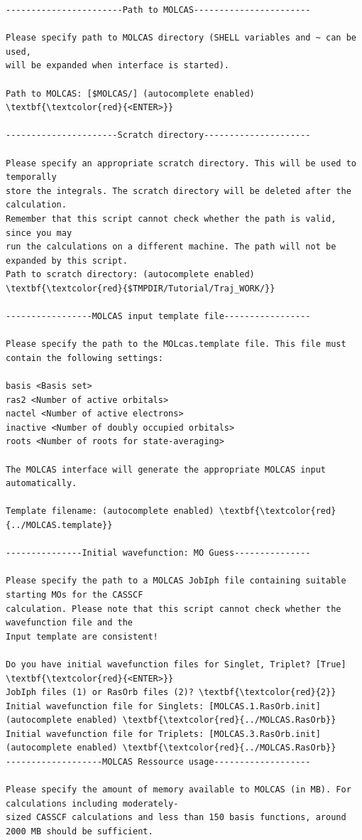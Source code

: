 \documentclass[a4paper,11pt,DIV=15,openany]{scrbook}
\begin{document}
\begin{oframed}
\begin{Verbatim}[commandchars=\\\{\}]
-----------------------Path to MOLCAS-----------------------

Please specify path to MOLCAS directory (SHELL variables and ~ can be used, 
will be expanded when interface is started).

Path to MOLCAS: [$MOLCAS/] (autocomplete enabled) \textbf{\textcolor{red}{<ENTER>}}

----------------------Scratch directory---------------------

Please specify an appropriate scratch directory. This will be used to temporally 
store the integrals. The scratch directory will be deleted after the calculation. 
Remember that this script cannot check whether the path is valid, since you may 
run the calculations on a different machine. The path will not be expanded by this script.
Path to scratch directory: (autocomplete enabled) \textbf{\textcolor{red}{$TMPDIR/Tutorial/Traj_WORK/}}

-----------------MOLCAS input template file-----------------

Please specify the path to the MOLcas.template file. This file must contain the following settings:

basis <Basis set>
ras2 <Number of active orbitals>
nactel <Number of active electrons>
inactive <Number of doubly occupied orbitals>
roots <Number of roots for state-averaging>

The MOLCAS interface will generate the appropriate MOLCAS input automatically.

Template filename: (autocomplete enabled) \textbf{\textcolor{red}{../MOLCAS.template}}

---------------Initial wavefunction: MO Guess---------------

Please specify the path to a MOLCAS JobIph file containing suitable starting MOs for the CASSCF 
calculation. Please note that this script cannot check whether the wavefunction file and the 
Input template are consistent!

Do you have initial wavefunction files for Singlet, Triplet? [True] \textbf{\textcolor{red}{<ENTER>}}
JobIph files (1) or RasOrb files (2)? \textbf{\textcolor{red}{2}}
Initial wavefunction file for Singlets: [MOLCAS.1.RasOrb.init] (autocomplete enabled) \textbf{\textcolor{red}{../MOLCAS.RasOrb}}
Initial wavefunction file for Triplets: [MOLCAS.3.RasOrb.init] (autocomplete enabled) \textbf{\textcolor{red}{../MOLCAS.RasOrb}}
-------------------MOLCAS Ressource usage-------------------

Please specify the amount of memory available to MOLCAS (in MB). For calculations including moderately-
sized CASSCF calculations and less than 150 basis functions, around 2000 MB should be sufficient.


\end{Verbatim}
\end{oframed}
\end{document}

